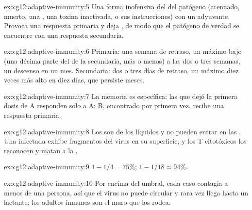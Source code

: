 \begin{solution}{exo:g12:adaptive-immunity:5}
Una forma inofensiva del  del patógeno (atenuado, muerto, una
, una toxina inactivada, o sus instrucciones) con un adyuvante.
Provoca una respuesta primaria y deja , de modo que
el patógeno de verdad se encuentre con una respuesta secundaria.
\end{solution}

\begin{solution}{exo:g12:adaptive-immunity:6}
Primaria: una semana de retraso, un máximo bajo (una décima parte del
de la secundaria, más o menos) a las dos o tres semanas, un descenso en
un mes. Secundaria: dos o tres días de retraso, un máximo diez veces
más alto en diez días, que persiste meses.
\end{solution}

\begin{solution}{exo:g12:adaptive-immunity:7}
La memoria es específica: las  que dejó la primera
dosis de A responden solo a A; B, encontrado por primera vez, recibe
una respuesta primaria.
\end{solution}

\begin{solution}{exo:g12:adaptive-immunity:8}
Los  son  de los líquidos y no pueden entrar en las
. Una  infectada exhibe fragmentos del virus en su
superficie, y los  T citotóxicos los reconocen y matan a la
.
\end{solution}

\begin{solution}{exo:g12:adaptive-immunity:9}
$1 - 1/4 = 75\%$; $1 - 1/18 \approx 94\%$.
\end{solution}

\begin{solution}{exo:g12:adaptive-immunity:10}
Por encima del umbral, cada caso contagia a menos de una persona, así
que el virus no puede circular y rara vez llega hasta un lactante; los
adultos inmunes son el muro que los rodea.
\end{solution}

